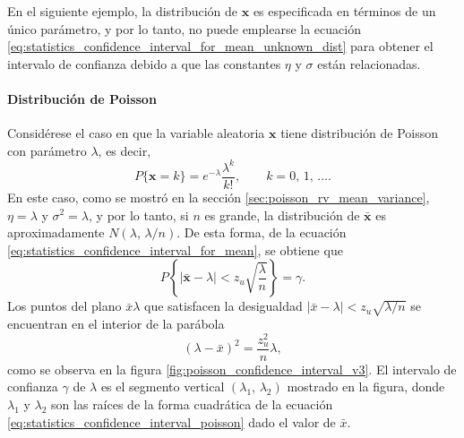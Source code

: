 \documentclass[a4paper]{report}
\newcommand{\x}{\mathbf{x}}
\begin{document}
En el siguiente ejemplo, la distribución de \(\x\) es especificada en términos de un único parámetro, y por lo tanto, no puede emplearse la ecuación \ref{eq:statistics_confidence_interval_for_mean_unknown_dist} para obtener el intervalo de confianza debido a que las constantes \(\eta\) y \(\sigma\) están relacionadas.

\paragraph{Distribución de Poisson} Considérese el caso en que la variable aleatoria \(\x\) tiene distribución de Poisson con parámetro \(\lambda\), es decir,
\[
 P\{\x=k\}=e^{-\lambda}\frac{\lambda^k}{k!},\qquad k=0,\,1,\,\dots.
\]
En este caso, como se mostró en la sección \ref{sec:poisson_rv_mean_variance}, \(\eta=\lambda\) y \(\sigma^2=\lambda\), y por lo tanto, si \(n\) es grande, la distribución de \(\bar{\x}\) es aproximadamente \(N(\lambda,\,\lambda/n)\). De esta forma, de la ecuación \ref{eq:statistics_confidence_interval_for_mean}, se obtiene que 
\[
 P\left\{|\bar{\x}-\lambda|<z_u\sqrt{\frac{\lambda}{n}}\right\}=\gamma.
\]
Los puntos del plano \(\bar{x}\lambda\) que satisfacen la desigualdad \(|\bar{x}-\lambda|<z_u\sqrt{\lambda/n}\) se encuentran en el interior de la parábola
\begin{equation}\label{eq:statistics_confidence_interval_poisson}
 (\lambda-\bar{x})^2=\frac{z_u^2}{n}\lambda,
\end{equation}
como se observa en la figura \ref{fig:poisson_confidence_interval_v3}. El intervalo de confianza \(\gamma\) de \(\lambda\) es el segmento vertical \((\lambda_1,\,\lambda_2)\) mostrado en la figura, donde \(\lambda_1\) y \(\lambda_2\) son las raíces de la forma cuadrática de la ecuación \ref{eq:statistics_confidence_interval_poisson} dado el valor de \(\bar{x}\).
\end{document}
